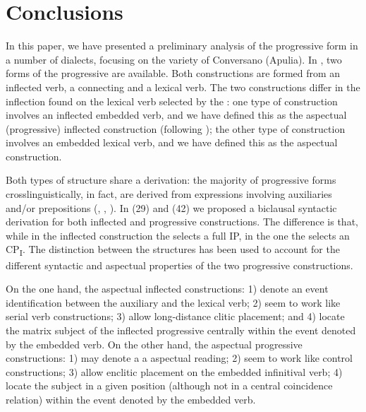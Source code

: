 \documentclass[output=paper]{langsci/langscibook}
\begin{document}
\section{Conclusions}%
In this paper, we have presented a preliminary analysis of the progressive form in a number of  dialects, focusing on the variety of Conversano (Apulia). In , two forms of the progressive are available. Both constructions are formed from an inflected  verb, a connecting  and a lexical verb. The two constructions differ in the inflection found on the lexical verb selected by the : one type of construction involves an inflected embedded verb, and we have defined this as the aspectual (progressive) inflected construction (following \citealt{Manzini2005}); the other type of construction involves an  embedded lexical verb, and we have defined this as the aspectual  construction. 

Both types of structure share a  derivation: the majority of progressive forms crosslinguistically, in fact, are derived from expressions involving  auxiliaries and\slash or  prepositions (\citealt{Bybee1994}, \citealt{Mateu1999}, \citealt{Laka2006}). In (29) and (42) we proposed a biclausal syntactic derivation for both inflected and  progressive constructions. The difference is that, while in the inflected construction the   selects a full IP, in the  one the   selects an  CP\textsubscript{I}. The distinction between the structures has been used to account for the different syntactic and aspectual properties of the two progressive constructions. 

On the one hand, the aspectual inflected constructions: 1) denote an event identification between the auxiliary and the lexical verb; 2) seem to work like serial verb constructions; 3) allow long-distance clitic placement; and 4) locate the matrix subject of the inflected progressive centrally within the event denoted by the embedded verb. On the other hand, the aspectual  progressive constructions: 1) may denote a a  aspectual reading; 2) seem to work like control constructions; 3) allow enclitic placement on the embedded infinitival verb; 4) locate the subject in a given position (although not in a central coincidence relation) within the event denoted by the embedded verb. 
\end{document}
